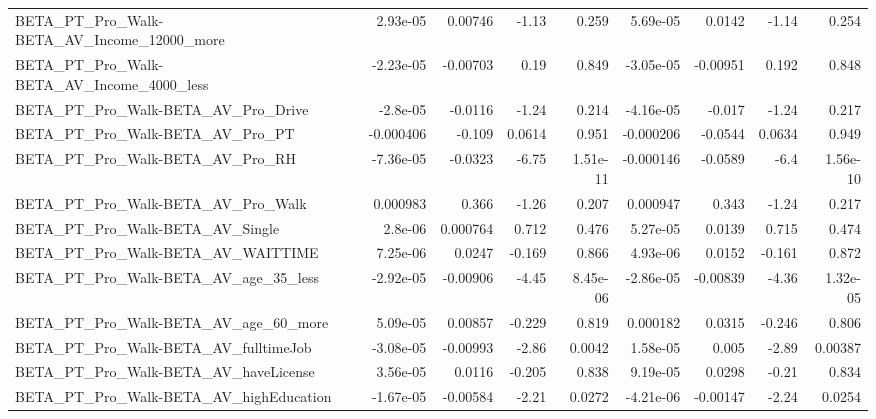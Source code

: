 \begin{tabular}{lrrrrrrrr}
BETA\_PT\_Pro\_Walk-BETA\_AV\_Income\_12000\_more         &    2.93e-05 &      0.00746 &     -1.13 &    0.259 &   5.69e-05 &      0.0142 &        -1.14 &         0.254 \\
BETA\_PT\_Pro\_Walk-BETA\_AV\_Income\_4000\_less          &   -2.23e-05 &     -0.00703 &      0.19 &    0.849 &  -3.05e-05 &    -0.00951 &        0.192 &         0.848 \\
BETA\_PT\_Pro\_Walk-BETA\_AV\_Pro\_Drive                 &    -2.8e-05 &      -0.0116 &     -1.24 &    0.214 &  -4.16e-05 &      -0.017 &        -1.24 &         0.217 \\
BETA\_PT\_Pro\_Walk-BETA\_AV\_Pro\_PT                    &   -0.000406 &       -0.109 &    0.0614 &    0.951 &  -0.000206 &     -0.0544 &       0.0634 &         0.949 \\
BETA\_PT\_Pro\_Walk-BETA\_AV\_Pro\_RH                    &   -7.36e-05 &      -0.0323 &     -6.75 & 1.51e-11 &  -0.000146 &     -0.0589 &         -6.4 &      1.56e-10 \\
BETA\_PT\_Pro\_Walk-BETA\_AV\_Pro\_Walk                  &    0.000983 &        0.366 &     -1.26 &    0.207 &   0.000947 &       0.343 &        -1.24 &         0.217 \\
BETA\_PT\_Pro\_Walk-BETA\_AV\_Single                    &     2.8e-06 &     0.000764 &     0.712 &    0.476 &   5.27e-05 &      0.0139 &        0.715 &         0.474 \\
BETA\_PT\_Pro\_Walk-BETA\_AV\_WAITTIME                  &    7.25e-06 &       0.0247 &    -0.169 &    0.866 &   4.93e-06 &      0.0152 &       -0.161 &         0.872 \\
BETA\_PT\_Pro\_Walk-BETA\_AV\_age\_35\_less               &   -2.92e-05 &     -0.00906 &     -4.45 & 8.45e-06 &  -2.86e-05 &    -0.00839 &        -4.36 &      1.32e-05 \\
BETA\_PT\_Pro\_Walk-BETA\_AV\_age\_60\_more               &    5.09e-05 &      0.00857 &    -0.229 &    0.819 &   0.000182 &      0.0315 &       -0.246 &         0.806 \\
BETA\_PT\_Pro\_Walk-BETA\_AV\_fulltimeJob               &   -3.08e-05 &     -0.00993 &     -2.86 &   0.0042 &   1.58e-05 &       0.005 &        -2.89 &       0.00387 \\
BETA\_PT\_Pro\_Walk-BETA\_AV\_haveLicense               &    3.56e-05 &       0.0116 &    -0.205 &    0.838 &   9.19e-05 &      0.0298 &        -0.21 &         0.834 \\
BETA\_PT\_Pro\_Walk-BETA\_AV\_highEducation             &   -1.67e-05 &     -0.00584 &     -2.21 &   0.0272 &  -4.21e-06 &    -0.00147 &        -2.24 &        0.0254 \\

\end{tabular}
